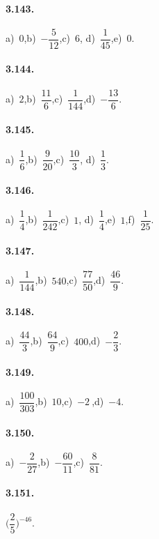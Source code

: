 \begin{multicols}{2}
\paragraph{3.143.}
a)~$0$,\quad b)~$-\dfrac{5}{12}$,\quad c)~$6$,\quad %
d)~$\dfrac{1}{45}$,\quad e)~$0$.

\paragraph{3.144.}
a)~$2$,\quad b)~$\dfrac{11}{6}$,\quad c)~$\dfrac{1}{144}$,\quad d)~$-\dfrac{13}{6}$.

\paragraph{3.145.}
a)~$\dfrac{1}{6}$,\quad b)~$\dfrac{9}{20}$,\quad c)~$\dfrac{10}{3}$,\quad %
d)~$\dfrac{1}{3}$.

\paragraph{3.146.}
a)~$\dfrac{1}{4}$,\quad b)~$\dfrac{1}{242}$,\quad c)~$1$,\quad %
d)~$\dfrac{1}{4}$,\quad e)~$1$,\quad f)~$\dfrac{1}{25}$.

\paragraph{3.147.}
a)~$\dfrac{1}{144}$,\quad b)~$540$,\quad c)~$\dfrac{77}{50}$,\quad d)~$\dfrac{46}{9}$.

\paragraph{3.148.}
a)~$\dfrac{44}{3}$,\quad b)~$\dfrac{64}{9}$,\quad c)~$400$,\quad d)~$-\dfrac{2}{3}$.

\paragraph{3.149.}
a)~$\dfrac{100}{303}$,\quad b)~$10$,\quad c)~$-2~$,\quad d)~$-4$.

\paragraph{3.150.}
a)~$-\dfrac{2}{27}$,\quad b)~$-\dfrac{60}{11}$,\quad c)~$\dfrac{8}{81}$.%

\paragraph{3.151.}
$\bigg(\dfrac{2}{5}\bigg)^{-46}$.


\end{multicols}
